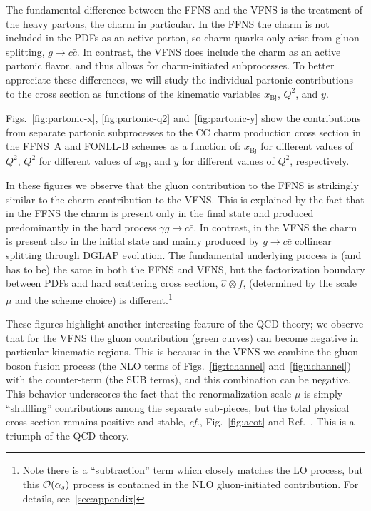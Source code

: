 \documentclass[pdftex,twocolumn,epjc3]{svjour3}          %
\newcommand{\xbj}{\ensuremath{x_{\text{Bj}}}\xspace}
\newcommand{\fonll} {{FONLL-B}\xspace}
\newcommand{\ffns} {{FFNS~A}\xspace}
\begin{document}

The fundamental difference between the FFNS and the VFNS is the
treatment of the heavy partons, the charm in particular. In the FFNS
the charm is not included in the PDFs as an active parton, so charm
quarks only arise from gluon splitting, $g\to c \bar{c}$. In contrast,
the VFNS does include the charm as an active partonic flavor, and thus
allows for charm-initiated subprocesses.
%
To better appreciate these differences, we will study the individual
partonic contributions to the cross section as functions of the
kinematic variables \xbj, $Q^2$, and $y$.

Figs.~\ref{fig:partonic-x}, \ref{fig:partonic-q2}
and~\ref{fig:partonic-y} show the contributions from separate partonic
subprocesses to the CC charm production cross section in the \ffns and
\fonll schemes as a function of: \xbj for different values of $Q^2$,
$Q^2$ for different values of \xbj, and $y$ for different values of
$Q^2$, respectively.

%
In these figures we observe that the gluon contribution to the FFNS is
strikingly similar to the charm contribution to the VFNS.
%
This is explained by the fact that in the FFNS the charm is present
only in the final state and produced predominantly in the hard process
$\gamma g \to c\bar{c}$. In contrast, in the VFNS the charm is present also
in the initial state and mainly produced by $g\to c\bar{c}$ collinear
splitting through DGLAP evolution.
%
The fundamental underlying process is (and has to be) the same in both
the FFNS and VFNS, but the factorization boundary between PDFs and
hard scattering cross section, $\hat{\sigma}\otimes f$, (determined by
the scale $\mu$ and the scheme choice) is different.\footnote{Note
  there is a ``subtraction'' term which closely matches the LO
  process, but this ${\cal O}(\alpha_s)$ process is contained in the
  NLO gluon-initiated contribution.  For details,
  see~\ref{sec:appendix} }


These figures highlight another interesting feature of the QCD theory;
we observe that for the VFNS the gluon contribution (green curves) can
become negative in particular kinematic regions.
This is because in the VFNS we combine the gluon-boson fusion process
(the NLO terms of Figs.~\ref{fig:tchannel} and~\ref{fig:uchannel})
with the counter-term  (the SUB terms),
and this combination can be negative.
%
This behavior underscores the fact that the renormalization scale $\mu$
is simply ``shuffling'' contributions among the separate sub-pieces,
but the total physical cross section remains positive and stable,
{\it cf.}, Fig.~\ref{fig:acot} and Ref.~\cite{Aivazis:1993pi}.
This is a triumph of the QCD theory. 
\end{document}

